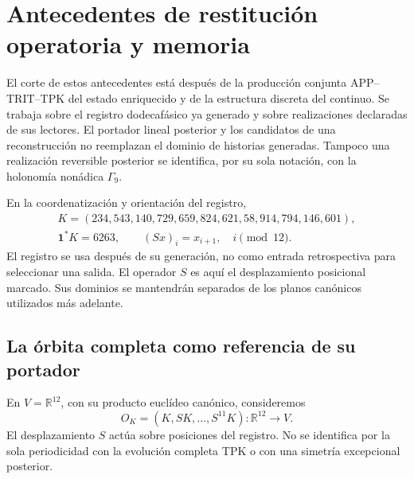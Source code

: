 \section{Antecedentes de restitución operatoria y memoria}
\label{md:antmem:capitulo}

El corte de estos antecedentes está después de la producción conjunta
APP--TRIT--TPK del estado enriquecido y de la estructura discreta del
continuo. Se trabaja sobre el registro dodecafásico ya generado y sobre
realizaciones declaradas de sus lectores. El portador lineal posterior
y los candidatos de una reconstrucción no reemplazan el dominio de
historias generadas. Tampoco una realización reversible posterior se
identifica, por su sola notación, con la holonomía nonádica \(\Gamma_9\).

En la coordenatización y orientación del registro,
\begin{equation}
 \begin{gathered}
 K=(234,543,140,729,659,824,621,58,914,794,146,601),\\
 \mathbf1^{*}K=6263,\qquad
 (Sx)_i=x_{i+1},\quad i\pmod {12}.
 \end{gathered}
 \label{md:antmem:registro}
\end{equation}
El registro se usa después de su generación, no como entrada
retrospectiva para seleccionar una salida. El operador \(S\) es aquí
el desplazamiento posicional marcado. Sus dominios se mantendrán
separados de los planos canónicos utilizados más adelante.

\subsection{La órbita completa como referencia de su portador}
\label{md:antmem:k:orbita}

En \(V=\mathbb R^{12}\), con su producto euclídeo canónico, consideremos
\[
 O_K=(K,SK,\ldots,S^{11}K):\mathbb R^{12}\longrightarrow V.
\]
El desplazamiento \(S\) actúa sobre posiciones del registro. No se
identifica por la sola periodicidad con la evolución completa TPK o con
una simetría excepcional posterior.

